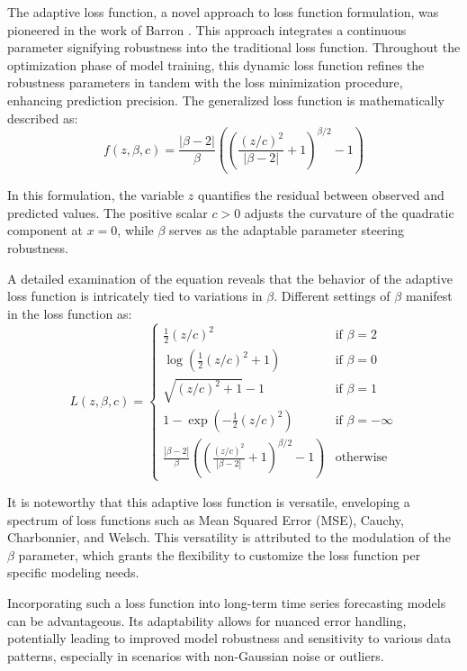 \documentclass[sn-mathphys,Numbered]{sn-jnl}
\theoremstyle{thmstyleone}%
\theoremstyle{thmstyletwo}%
\theoremstyle{thmstylethree}%
\begin{document}
The adaptive loss function, a novel approach to loss function formulation, was pioneered in the work of Barron \cite{barron2019general}. This approach integrates a continuous parameter signifying robustness into the traditional loss function. Throughout the optimization phase of model training, this dynamic loss function refines the robustness parameters in tandem with the loss minimization procedure, enhancing prediction precision. The generalized loss function is mathematically described as:
\begin{equation}
f(z, \beta, c) = \frac{|\beta-2|}{\beta}\left(\left(\frac{(z / c)^2}{|\beta-2|}+1\right)^{\beta / 2}-1\right)
\end{equation}

In this formulation, the variable \(z\) quantifies the residual between observed and predicted values. The positive scalar \(c > 0\) adjusts the curvature of the quadratic component at \(x = 0\), while \(\beta\) serves as the adaptable parameter steering robustness.

A detailed examination of the equation reveals that the behavior of the adaptive loss function is intricately tied to variations in \(\beta\). Different settings of \(\beta\) manifest in the loss function as:
\begin{equation}
L(z, \beta, c) = 
\begin{cases}
\frac{1}{2}(z / c)^2 & \text{if } \beta=2 \\
\log \left(\frac{1}{2}(z / c)^2+1\right) & \text{if } \beta=0 \\
\sqrt{(z / c)^2+1}-1 & \text{if } \beta=1 \\
1-\exp \left(-\frac{1}{2}(z / c)^2\right) & \text{if } \beta=-\infty \\
\frac{|\beta-2|}{\beta}\left(\left(\frac{(z / c)^2}{|\beta-2|}+1\right)^{\beta / 2}-1\right) & \text{otherwise}
\end{cases}
\end{equation}

It is noteworthy that this adaptive loss function is versatile, enveloping a spectrum of loss functions such as Mean Squared Error (MSE), Cauchy, Charbonnier, and Welsch. This versatility is attributed to the modulation of the \(\beta\) parameter, which grants the flexibility to customize the loss function per specific modeling needs.

Incorporating such a loss function into long-term time series forecasting models can be advantageous. Its adaptability allows for nuanced error handling, potentially leading to improved model robustness and sensitivity to various data patterns, especially in scenarios with non-Gaussian noise or outliers.
\end{document}
